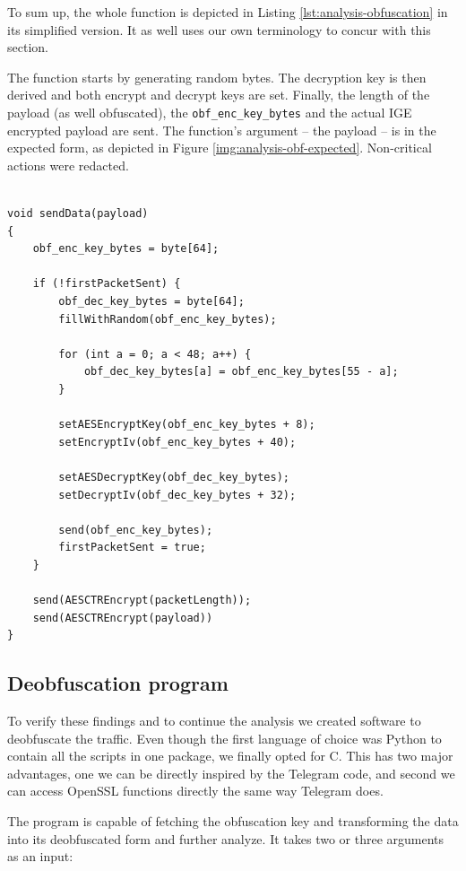 \documentclass[thesis=M,english]{FITthesis}[2012/10/20]
\newcommand{\cpp}{C\nolinebreak\hspace{-.05em}\raisebox{.4ex}{\tiny +}\nolinebreak\hspace{-.10em}\raisebox{.4ex}{\tiny +}}
\begin{document}
To sum up, the whole function is depicted in Listing \ref{lst:analysis-obfuscation} in its simplified version. It as well uses our own terminology to concur with this section.

\begin{listing}[htb]
\caption{The function starts by generating random bytes. The decryption key is then derived and both encrypt and decrypt keys are set. Finally, the length of the payload (as well obfuscated), the \texttt{obf\_enc\_key\_bytes} and the actual IGE encrypted payload are sent. The function's argument -- the payload -- is in the expected form, as depicted in Figure \ref{img:analysis-obf-expected}. Non-critical actions were redacted.}
\label{lst:analysis-obfuscation}
\begin{verbatim}

void sendData(payload)
{
    obf_enc_key_bytes = byte[64];

    if (!firstPacketSent) {
        obf_dec_key_bytes = byte[64];
        fillWithRandom(obf_enc_key_bytes);

        for (int a = 0; a < 48; a++) {
            obf_dec_key_bytes[a] = obf_enc_key_bytes[55 - a];
        }

        setAESEncryptKey(obf_enc_key_bytes + 8);
        setEncryptIv(obf_enc_key_bytes + 40);

        setAESDecryptKey(obf_dec_key_bytes);
        setDecryptIv(obf_dec_key_bytes + 32);
        
        send(obf_enc_key_bytes);
        firstPacketSent = true;
    }

    send(AESCTREncrypt(packetLength));
    send(AESCTREncrypt(payload))
}
\end{verbatim}
\end{listing}

\subsection{Deobfuscation program}

To verify these findings and to continue the analysis we created software to deobfuscate the traffic. Even though the first language of choice was Python to contain all the scripts in one package, we finally opted for \cpp. This has two major advantages, one we can be directly inspired by the Telegram code, and second we can access OpenSSL functions directly the same way Telegram does.

The program is capable of fetching the obfuscation key and transforming the data into its deobfuscated form and further analyze. It takes two or three arguments as an input:
\end{document}
